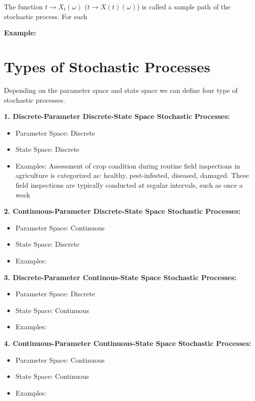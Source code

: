 \documentclass[
  letterpaper,
  DIV=11,
  numbers=noendperiod]{scrreprt}
\begin{document}
The function \(t \rightarrow X_t(\omega)\)
(\(t \rightarrow X(t)(\omega)\)) is called a sample path of the
stochastic process. For each

\textbf{Example:}

\section{Types of Stochastic
Processes}\label{types-of-stochastic-processes}

Depending on the parameter space and state space we can define four type
of stochastic processes.

\textbf{1. Discrete-Parameter Discrete-State Space Stochastic
Processes:}

\begin{itemize}
\item
  Parameter Space: Discrete
\item
  State Space: Discrete
\item
  Examples: Assessment of crop condition during routine field
  inspections in agriculture is categorized as: healthy, pest-infested,
  diseased, damaged. These field inspections are typically conducted at
  regular intervals, such as once a week
\end{itemize}

\textbf{2. Continuous-Parameter Discrete-State Space Stochastic
Processes:}

\begin{itemize}
\item
  Parameter Space: Continuous
\item
  State Space: Discrete
\item
  Examples:
\end{itemize}

\textbf{3. Discrete-Parameter Continous-State Space Stochastic
Processes:}

\begin{itemize}
\item
  Parameter Space: Discrete
\item
  State Space: Continuous
\item
  Examples:
\end{itemize}

\textbf{4. Continuous-Parameter Continuous-State Space Stochastic
Processes:}

\begin{itemize}
\item
  Parameter Space: Continuous
\item
  State Space: Continuous
\item
  Examples:
\end{itemize}
\end{document}
